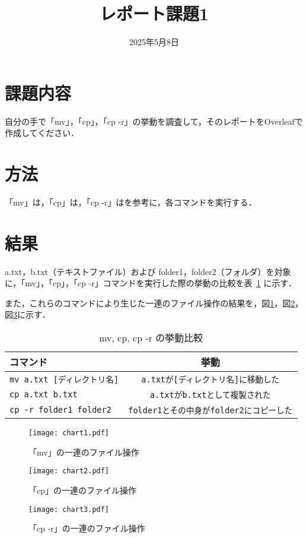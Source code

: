 \documentclass[a4paper,12pt]{jsreport}
\title{レポート課題1}
\author{}
\date{2025年5月8日}
\begin{document}
\maketitle

\section{課題内容}
自分の手で「mv」，「cp」，「cp -r」の挙動を調査して，そのレポートをOverleafで作成してください．

\section{方法}
「mv」は\cite{bib:mv}，「cp」は\cite{bib:cp}，「cp -r」は\cite{bib:cp-r}を参考に，各コマンドを実行する．

\section{結果}
 a.txt，b.txt（テキストファイル）および folder1，folder2（フォルダ）を対象に，「mv」，「cp」，「cp -r」コマンドを実行した際の挙動の比較を表~\ref{tbl:lcr} に示す．\par また，これらのコマンドにより生じた一連のファイル操作の結果を，図\ref{fig:chart1}，図\ref{fig:chart2}，図\ref{fig:chart3}に示す．

\begin{table}[h]
\caption{mv, cp, cp -r の挙動比較}
\label{tbl:lcr} 
\begin{tabular}{|l||c|}
\hline
\textbf{コマンド} & \textbf{挙動} \\
\hline
\texttt{mv a.txt [ディレクトリ名]} & \texttt{a.txtが[ディレクトリ名]に移動した} \\
\hline
\texttt{cp a.txt b.txt} & \texttt{a.txtがb.txtとして複製された} \\
\hline
\texttt{cp -r folder1 folder2} & \texttt{folder1とその中身がfolder2にコピーした} \\
\hline
\end{tabular}
\end{table}


\begin{figure}[h]
\centering
\texttt{[image: chart1.pdf]}
\caption{「mv」の一連のファイル操作}
\label{fig:chart1}
\end{figure}

\begin{figure}[h]
\centering
\texttt{[image: chart2.pdf]}
\caption{「cp」の一連のファイル操作}
\label{fig:chart2}
\end{figure}

\begin{figure}[h]
\centering
\texttt{[image: chart3.pdf]}
\caption{「cp -r」の一連のファイル操作}
\label{fig:chart3}
\end{figure}



\end{document}
